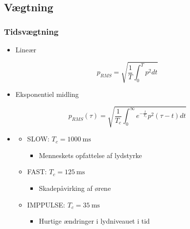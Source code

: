 \subsection{Vægtning}
\subsubsection{Tidsvægtning}
\begin{itemize}
	\item Lineær
\end{itemize}

\begin{equation}
p_{RMS}=\sqrt{\dfrac{1}{T}\int_{0}^{T}p^2 dt}
\end{equation}

\begin{itemize}
	\item Eksponentiel midling
\end{itemize}

\begin{equation}
p_{RMS}(\tau)=\sqrt{\dfrac{1}{T_c}\int_{0}^{\infty}e^{-\frac{t}{T_c}}p^2(\tau-t)dt}
\end{equation}

\begin{itemize}
	\item[]
	\begin{itemize}
		\item SLOW: $T_c = \SI{1000}{\milli\second}$
		\begin{itemize}
			\item Menneskets opfattelse af lydstyrke
		\end{itemize}
		\item FAST: $T_c = \SI{125}{\milli\second}$
		\begin{itemize}
			\item Skadepåvirking af ørene
		\end{itemize}
		\item IMPPULSE: $T_c = \SI{35}{\milli\second}$
		\begin{itemize}
			\item Hurtige ændringer i lydniveauet i tid
		\end{itemize}
	\end{itemize} 
\end{itemize}


